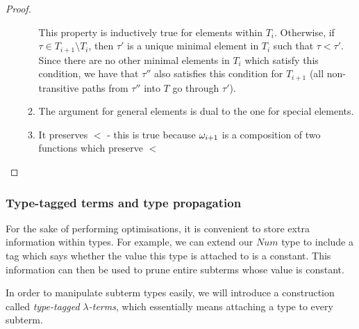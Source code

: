 \documentclass[main.tex]{subfiles}
\begin{document}
\begin{proof}
\begin{itemize}
\begin{enumerate}
                    This property is inductively true for elements within $T_i$.
                    Otherwise, if $\tau \in T_{i + 1} \setminus T_i$, then
                    $\tau'$ is a unique minimal element in
                    $T_i$ such that $\tau \less \tau'$. Since there are no other
                    minimal elements in $T_i$ which satisfy this condition,
                    we have that $\tau''$ also satisfies this condition for
                    $T_{i + 1}$ (all non-transitive paths from $\tau''$ into
                    $T$ go through $\tau'$).

                \item The argument for general elements is dual to the one
                    for special elements.
                \item It preserves $\less$ - this is true because $\omega_{i + 1}$
                    is a composition of two functions which preserve $\less$
            \end{enumerate}
    \end{itemize}
\end{proof}


\subsubsection{Type-tagged terms and type propagation}
\label{sec:propagation}
For the sake of performing optimisations, it is convenient to store extra
information within types. For example, we can extend our $Num$ type to include
a tag which says whether the value this type is attached to is a constant. This
information can then be used to prune entire subterms whose value is constant.

In order to manipulate subterm types easily, we will introduce a construction
called \emph{type-tagged $\lambda$-terms}, which essentially means attaching
a type to every subterm.
\end{document}
